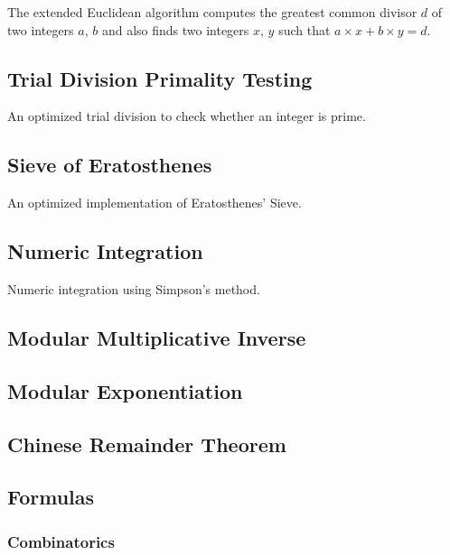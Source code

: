 \documentclass[8pt,a4paper]{amsart}
\begin{document}
The extended Euclidean algorithm computes the greatest common divisor $d$ of
two integers $a$, $b$ and also finds two integers $x$, $y$ such that $a\times x
+ b\times y = d$.


\subsection{Trial Division Primality Testing}
An optimized trial division to check whether an integer is prime.


\subsection{Sieve of Eratosthenes}
An optimized implementation of Eratosthenes' Sieve.


\subsection{Numeric Integration}
Numeric integration using Simpson's method.


\subsection{Modular Multiplicative Inverse}


\subsection{Modular Exponentiation}


\subsection{Chinese Remainder Theorem}


\subsection{Formulas}

\subsubsection{Combinatorics}
\end{document}
